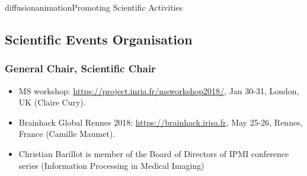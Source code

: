 \documentclass{ra2018}
\begin{document}
\begin{module}{diffusion}{animation}{Promoting Scientific Activities}



\subsection{Scientific Events Organisation}


    \subsubsection{General Chair, Scientific Chair}
    \begin{itemize}
        \item MS workshop: \url{https://project.inria.fr/msworkshop2018/}, Jan 30-31, London, UK (Claire Cury).
        \item Brainhack Global Rennes 2018: \url{https://brainhack.irisa.fr}, May 25-26, Rennes, France (Camille Maumet).
         \item Christian Barillot is member of the Board of Directors of IPMI conference series (Information Processing in Medical Imaging)
        
    \end{itemize}    
    


\end{module}
\end{document}
